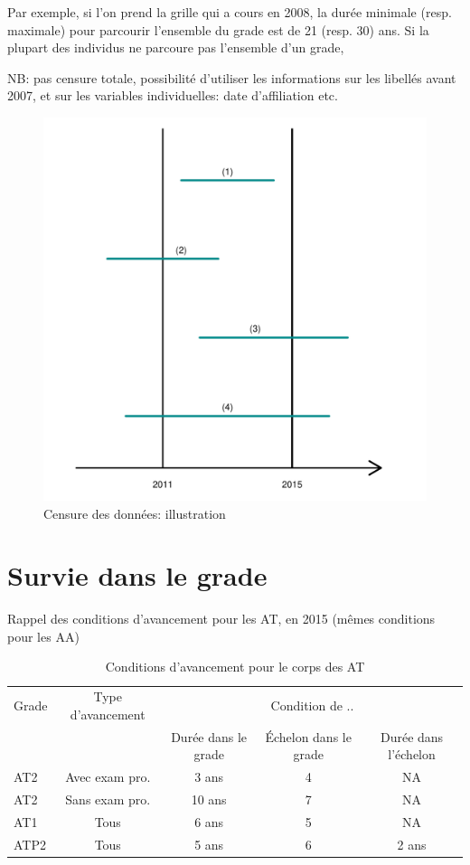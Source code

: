 \documentclass[11pt,a4paper]{article}
\begin{document}
Par exemple, si l'on prend la grille qui a cours en 2008, la durée minimale (resp. maximale) pour parcourir l'ensemble du grade est de 21 (resp. 30) ans. Si la plupart des individus ne parcoure pas l'ensemble d'un grade, 

NB: pas censure totale, possibilité d'utiliser les informations sur les libellés avant 2007, et sur les variables individuelles: date d'affiliation etc. 


\begin{figure}[ht] 
  \caption{Censure des données: illustration}
  \label{echelon_by_neg} 
    \includegraphics[width=1\linewidth]{schema_censoring.pdf} 
\end{figure}



\section{Survie dans le grade}

Rappel des conditions d'avancement pour les AT, en 2015 (mêmes conditions pour les AA)
\begin{table}[h!]
\label{means}
\centering
\caption{Conditions d'avancement pour le corps des AT} 
\begin{tabular}{l|c|ccc}
\toprule
 Grade  & Type d'avancement&  \multicolumn{3}{c}{ Condition de .. }  \\
		&  				   &  Durée dans le grade	&  Échelon	dans le grade & Durée dans l'échelon \\
\midrule
AT2  &	Avec exam pro. 	&   3 ans  & 	4  & NA \\
AT2  &	Sans exam pro. 	& 	10 ans &	7  &	NA \\
AT1  & Tous				& 	6 ans  &	5  &	NA \\
ATP2 & Tous				& 	5 ans  &	6  &	2 ans  \\	
%	
\bottomrule
\end{tabular}
\end{table}
\end{document}
